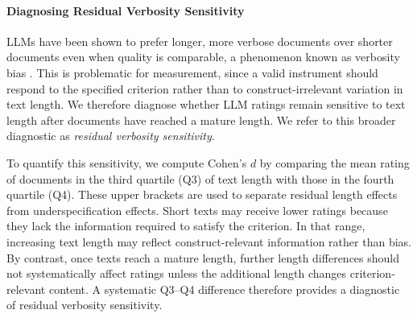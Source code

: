 




\paragraph{Diagnosing Residual Verbosity Sensitivity}


LLMs have been shown to prefer longer, more verbose documents over shorter documents even when quality is comparable, a phenomenon known as verbosity bias \citep{saito_verbosity_2023}. This is problematic for measurement, since a valid instrument should respond to the specified criterion rather than to construct-irrelevant variation in text length. We therefore diagnose whether LLM ratings remain sensitive to text length after documents have reached a mature length. We refer to this broader diagnostic as \textit{residual verbosity sensitivity}.

To quantify this sensitivity, we compute Cohen's $d$ by comparing the mean rating of documents in the third quartile (Q3) of text length with those in the fourth quartile (Q4). These upper brackets are used to separate residual length effects from underspecification effects. Short texts may receive lower ratings because they lack the information required to satisfy the criterion. In that range, increasing text length may reflect construct-relevant information rather than bias. By contrast, once texts reach a mature length, further length differences should not systematically affect ratings unless the additional length changes criterion-relevant content. A systematic Q3--Q4 difference therefore provides a diagnostic of residual verbosity sensitivity.

